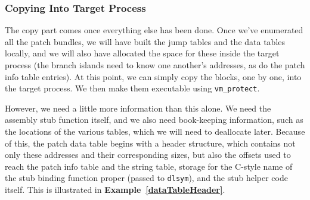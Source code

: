 \documentclass[english]{article}
\begin{document}
\subsubsection{Copying Into Target Process}
The copy part comes once everything else has been done. Once we've enumerated all the patch bundles, we will have built the jump tables and the data tables locally, and we will also have allocated the space for these inside the target process (the branch islands need to know one another's addresses, as do the patch info table entries). At this point, we can simply copy the blocks, one by one, into the target process. We then make them executable using \texttt{vm\_protect}.

However, we need a little more information than this alone. We need the assembly stub function itself, and we also need book-keeping information, such as the locations of the various tables, which we will need to deallocate later. Because of this, the patch data table begins with a header structure, which contains not only these addresses and their corresponding sizes, but also the offsets used to reach the patch info table and the string table, storage for the C-style name of the stub binding function proper (passed to \texttt{dlsym}), and the stub helper code itself. This is illustrated in \textbf{Example~\ref{dataTableHeader}}.
\end{document}
